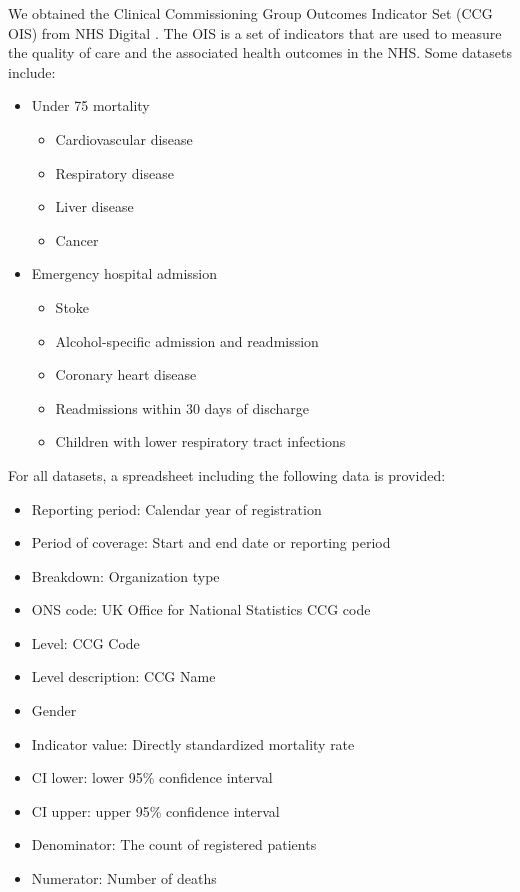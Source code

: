We obtained the Clinical Commissioning Group Outcomes Indicator Set (CCG OIS) from NHS Digital \cite{nhsdigitalClinical}. The OIS is a set of indicators that are used to measure the quality of care and the associated health outcomes in the NHS. Some datasets include:
\begin{itemize}
    \item Under 75 mortality
    \begin{multicols}{2}
        \begin{itemize}
            \item Cardiovascular disease
            \item Respiratory disease
            \item Liver disease
            \item Cancer
        \end{itemize}
    \end{multicols}
    \item Emergency hospital admission
        \begin{itemize}
            \item Stoke
            \item Alcohol-specific admission and readmission
            \item Coronary heart disease
            \item Readmissions within 30 days of discharge
            \item Children with lower respiratory tract infections
        \end{itemize}
\end{itemize}

For all datasets, a spreadsheet including the following data is provided:

\begin{itemize}
    \item Reporting period: Calendar year of registration
    \item Period of coverage: Start and end date or reporting period
    \item Breakdown: Organization type
    \item ONS code: UK Office for National Statistics CCG code
    \item Level: CCG Code
    \item Level description: CCG Name
    \item Gender
    \item Indicator value: Directly standardized mortality rate
    \item CI lower: lower 95\% confidence interval
    \item CI upper: upper 95\% confidence interval
    \item Denominator: The count of registered patients
    \item Numerator: Number of deaths
\end{itemize}